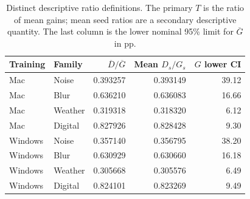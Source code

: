 \begin{table}[!htbp]
\centering
\small
\setlength{\tabcolsep}{5pt}
\caption{Distinct descriptive ratio definitions. The primary $T$ is the ratio of mean gains; mean seed ratios are a secondary descriptive quantity. The last column is the lower nominal 95\% limit for $\overline G$ in pp.}
\label{tab:ratios}
\begin{tabular}{llrrr}
\toprule
Training & Family & $\overline D/\overline G$ & Mean $D_s/G_s$ & $G$ lower CI \\
\midrule
Mac & Noise & 0.393257 & 0.393149 & 39.12 \\
Mac & Blur & 0.636210 & 0.636083 & 16.66 \\
Mac & Weather & 0.319318 & 0.318320 & 6.12 \\
Mac & Digital & 0.827926 & 0.828428 & 9.30 \\
Windows & Noise & 0.357140 & 0.356795 & 38.20 \\
Windows & Blur & 0.630929 & 0.630660 & 16.18 \\
Windows & Weather & 0.305668 & 0.305576 & 6.49 \\
Windows & Digital & 0.824101 & 0.823269 & 9.49 \\
\bottomrule
\end{tabular}
\end{table}
